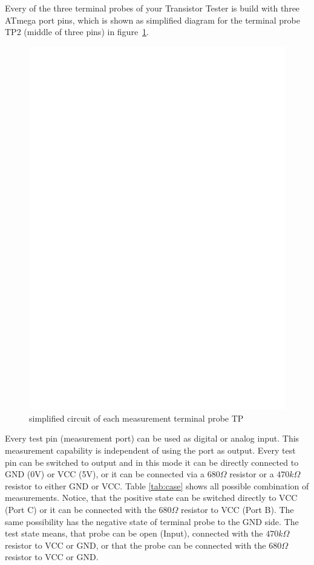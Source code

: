 Every of the three terminal probes of your Transistor Tester is build with three ATmega port pins,
which is shown as simplified diagram for the terminal probe TP2 (middle of three pins) in figure~\ref{fig:terminal}.

\begin{figure}[H]
\centering
\includegraphics[]{../FIG/terminal.eps}
\caption{simplified circuit of each measurement terminal probe TP}
\label{fig:terminal}
\end{figure}

Every test pin (measurement port) can be used as digital or analog input. This measurement capability is
independent of using the port as output.
Every test pin can be switched to output and in this mode it can be directly connected to GND (0V) or VCC (5V), 
or it can be connected via a \(680\Omega\) resistor or a \(470k\Omega\) resistor to either GND or VCC.
Table \ref{tab:case} shows all possible combination of measurements.
Notice, that the positive state can be switched directly to VCC (Port C) or it can be connected with the 
\(680\Omega\) resistor to VCC (Port B). The same possibility has the negative state of terminal probe to the GND side.
The test state means, that probe can be open (Input), connected with the \(470k\Omega\) resistor to VCC or GND,
or that the probe can be connected with the \(680\Omega\) resistor to VCC or GND.

